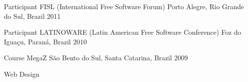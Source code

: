 \begin{cventries}
  \cventry
	{Participant} %
	{FISL (International Free Software Forum)} %
	{Porto Alegre, Rio Grande do Sul, Brazil} %
	{2011} %
	{
	}

\cventry
	{Participant} %
	{LATINOWARE (Latin American Free Software Conference)} %
	{Foz do Iguaçu, Paraná, Brazil} %
	{2010} %
	{
	}

  \cventry
	{Course} %
	{MegaZ} %
	{São Bento do Sul, Santa Catarina, Brazil} %
	{2009} %
	{
		\begin{cvitems} %
			\item {Web Design}
		\end{cvitems}
	}

\end{cventries}
